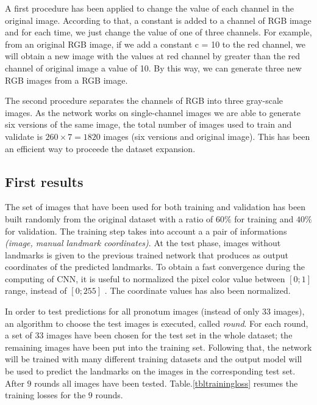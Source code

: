 \documentclass[10pt]{article}
\begin{document}
A first procedure has been applied to change the value of each
channel in the original image. According to that, a constant is
added to a channel of RGB image and for each time, we just
change the value of one of three channels. For example, from
an original RGB image, if we add a constant c = 10 to the
red channel, we will obtain a new image with the values at
red channel by greater than the red channel of original image
a value of 10. By this way, we can generate three new RGB
images from a RGB image.

The second procedure separates the channels of RGB into
three gray-scale images. As the network works on single-channel images
we are able to  generate six versions of the same image, the total number of
images used to train and validate is $260 \times 7 = 1820$ images
(six versions and original image). This has been an efficient way to
proceede the dataset expansion. 


\subsection{First results}
\label{sectrain1}
The set of images that have been used for both training and validation
has been built randomly from the original dataset with a ratio of
$60\%$ for training and $40\%$ for  validation. The training step
takes into account a a pair of informations \textit{(image, manual
  landmark coordinates)}. At the test phase, images without landmarks
is given to the previous trained network that produces as output
coordinates of the predicted landmarks. To obtain a fast convergence
during the computing of CNN, it is useful to normalized the pixel
color value between $[0; 1]$ range, instead of $[0; 255]$  \cite{lecun2012efficient}. The
coordinate values has also been normalized.

In order to test predictions for all pronotum images (instead
of only $33$ images), an algorithm to choose the test images is executed,
called \textit{round}. For each round, a set of 33 images have been
chosen for the test set in the whole dataset; the remaining images have been put into the
training set. Following that, the network will be trained with many
different training datasets and the output model will be used to
predict the landmarks on the images in the corresponding test
set. After $9$ rounds all images have been
tested. Table.\ref{tbltrainingloss} resumes the training losses for
the $9$ rounds.
\end{document}
